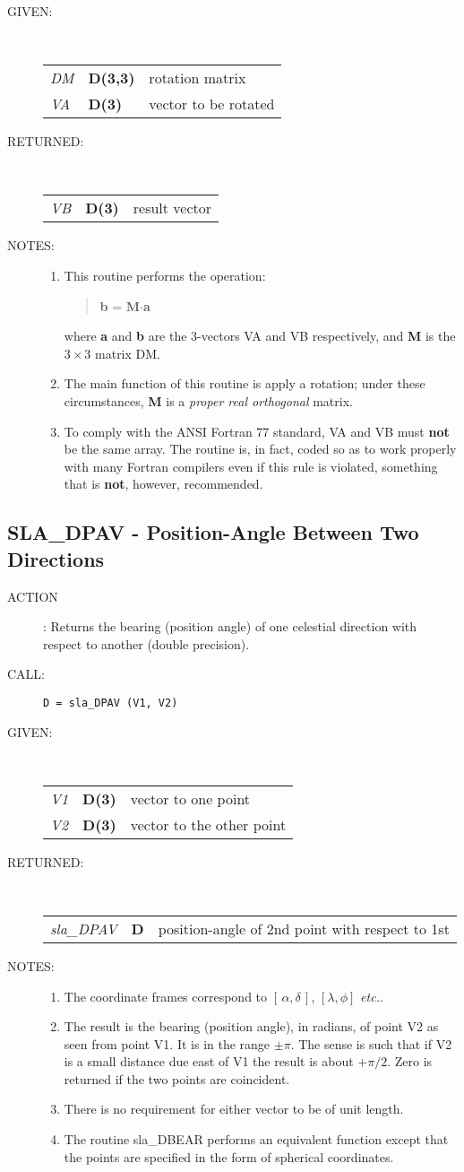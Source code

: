 \documentclass[11pt,twoside]{article}
\newcommand{\xlabel}[1]{}
\newcommand{\radec}     {$[\,\alpha,\delta\,]$}
\newcommand{\routine}[3]
{\hbadness=10000
  \vbox
  {
    \rule{\textwidth}{0.3mm}\\
    {\Large {\bf #1} \hfill #2 \hfill {\bf #1}}\\
    \setlength{\oldspacing}{\topsep}
    \setlength{\topsep}{0.3ex}
    \begin{description}
      #3
    \end{description}
    \setlength{\topsep}{\oldspacing}
  }
}
\renewcommand{\routine}[3]
   {
      \subsection{#1\xlabel{#1} - #2\label{#1}}
       \begin{description}
         #3
       \end{description}
   }
\newcommand{\action}[1]
{\item[ACTION]: #1}
\newcommand{\action}[1]
   {\item[ACTION:] #1}
\newcommand{\call}[1]
{\item[CALL]: \hspace{0.4em}{\tt #1}}
\newlength{\oldspacing}
\renewcommand{\call}[1]
   {
    \item[CALL:] {\tt #1}
   }
\newcommand{\args}[2]
{
  \goodbreak
  \setlength{\oldspacing}{\topsep}
  \setlength{\topsep}{0.3ex}
  \begin{description}
  \item[#1]:\\[1.5ex]
    \begin{tabular}{p{7em}p{6em}p{22em}}
      #2
    \end{tabular}
  \end{description}
  \setlength{\topsep}{\oldspacing}
}
\renewcommand{\args}[2]
   {
     \begin{description}
        \item[#1:]\\
        \begin{tabular}{p{7em}p{6em}l}
           #2
        \end{tabular}
     \end{description}
   }
\newcommand{\spec}[3]
{
  {\em {#1}} & {\bf \mbox{#2}} & {#3}
}
\newcommand{\notes}[1]
{
  \goodbreak
  \setlength{\oldspacing}{\topsep}
  \setlength{\topsep}{0.3ex}
  \begin{description}
    \item[NOTES]:
        #1
  \end{description}
  \setlength{\topsep}{\oldspacing}
}
\renewcommand{\notes}[1]
   {
      \begin{description}
         \item[NOTES:]
            #1
      \end{description}
   }
\begin{document}
\args{GIVEN}
{
 \spec{DM}{D(3,3)}{rotation matrix} \\
 \spec{VA}{D(3)}{vector to be rotated}
}
\args{RETURNED}
{
 \spec{VB}{D(3)}{result vector}
}
\notes
{
 \begin{enumerate}
  \item This routine performs the operation:
        \begin{verse}
           {\bf b} = {\bf M}$\cdot${\bf a}
        \end{verse}
        where {\bf a} and {\bf b} are the 3-vectors VA and VB
        respectively, and {\bf M} is the $3\times3$ matrix DM.
  \item The main function of this routine is apply a
        rotation;  under these circumstances, {\bf M} is a
        {\it proper real orthogonal}\/ matrix.
  \item To comply with the ANSI Fortran 77 standard, VA and VB must
        {\bf not} be the same array.  The routine is, in fact, coded
        so as to work properly with many Fortran compilers even
        if this rule is violated, something that is {\bf not}, however,
        recommended.
 \end{enumerate}
}
\routine{SLA\_DPAV}{Position-Angle Between Two Directions}
{
 \action{Returns the bearing (position angle) of one celestial
         direction with respect to another (double precision).}
 \call{D~=~sla\_DPAV (V1, V2)}
}
\args{GIVEN}
{
 \spec{V1}{D(3)}{vector to one point} \\
 \spec{V2}{D(3)}{vector to the other point}
}
\args{RETURNED}
{
 \spec{sla\_DPAV}{D}{position-angle of 2nd point with respect to 1st}
}
\notes
{
 \begin{enumerate}
 \item The coordinate frames correspond to \radec,
       $[\lambda,\phi]$ {\it etc.}.
 \item The result is the bearing (position angle), in radians,
       of point V2 as seen
       from point V1.  It is in the range $\pm \pi$.  The sense
       is such that if V2
       is a small distance due east of V1 the result
       is about $+\pi/2$. Zero is returned
       if the two points are coincident.
 \item There is no requirement for either vector to be of unit length.
 \item The routine sla\_DBEAR performs an equivalent function except
       that the points are specified in the form of spherical coordinates.
 \end{enumerate}
}
\end{document}
